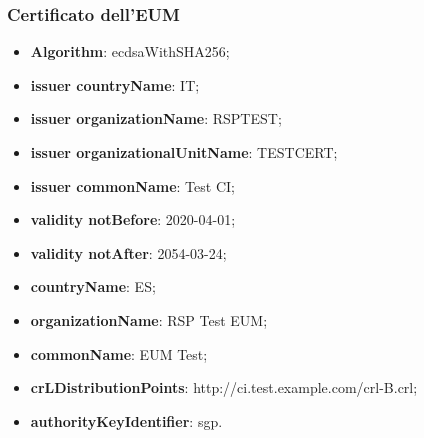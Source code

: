 \documentclass[10pt, oneside]{book}
\begin{document}
\subsubsection{Certificato dell'EUM}
\begin{itemize}
\item \textbf{Algorithm}: ecdsaWithSHA256;
\item \textbf{issuer countryName}: IT;
\item \textbf{issuer organizationName}: RSPTEST;
\item \textbf{issuer organizationalUnitName}: TESTCERT;
\item \textbf{issuer commonName}: Test CI;
\item \textbf{validity notBefore}: 2020-04-01;
\item \textbf{validity notAfter}: 2054-03-24;
\item \textbf{countryName}: ES;
\item \textbf{organizationName}: RSP Test EUM;
\item \textbf{commonName}: EUM Test;
\item \textbf{crLDistributionPoints}: http://ci.test.example.com/crl-B.crl;
\item \textbf{authorityKeyIdentifier}: sgp.
\end{itemize}
\end{document}
